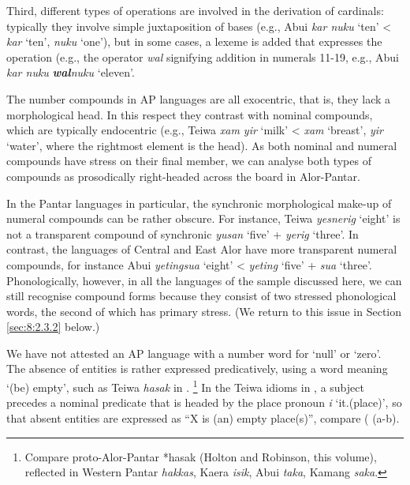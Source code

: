 \documentclass[output=paper]{LSP/langsci}
\begin{document}
Third, different types of operations are involved in the derivation of cardinals: typically they involve simple juxtaposition of bases (e.g., Abui \textit{kar nuku} `ten' {\textless} \textit{kar} `ten', \textit{nuku} `one'), but in some cases, a lexeme is added that expresses the operation (e.g., the operator \textit{wal} signifying addition in numerals 11-19, e.g., Abui \textit{kar nuku} \textbf{\textit{wal}}\textit{nuku} `eleven'. 

The number compounds in AP languages are all exocentric, that is, they lack a morphological head. In this respect they contrast with nominal compounds, which are typically endocentric (e.g., Teiwa \textit{xam yir} `milk' {\textless} \textit{xam} `breast', \textit{yir} `water', where the rightmost element is the head). As both nominal and numeral compounds have stress on their final member, we can analyse both types of compounds as prosodically right-headed across the board in Alor-Pantar. 

In the Pantar languages in particular, the synchronic morphological make-up of numeral compounds can be rather obscure. For instance, Teiwa \textit{yesnerig} `eight' is not a transparent compound of synchronic \textit{yusan} `five' + \textit{yerig} `three'. In contrast, the languages of Central and East Alor have more transparent numeral compounds, for instance Abui \textit{yetingsua} `eight' {\textless} \textit{yeting} `five' + \textit{sua} `three'. Phonologically, however, in all the languages of the sample discussed here, we can still recognise compound forms because they consist of two stressed phonological words, the second of which has primary stress. (We return to this issue in Section \ref{sec:8:2.3.2} below.) 

We have not attested an AP language with a number word for `null' or `zero'. The absence of entities is rather expressed predicatively, using a word meaning `(be) empty', such as Teiwa \textit{hasak} in .
\footnote{{}  Compare proto-Alor-Pantar *hasak (Holton and Robinson, this volume), reflected in Western Pantar \textit{hakkas}, Kaera \textit{isik}, Abui \textit{taka}, Kamang \textit{saka}.} In the Teiwa idioms in , a subject precedes a nominal predicate that is headed by the place pronoun \textit{i} `it.(place)', so that absent entities are expressed as ``X is (an) empty place(s)'', compare ( (a-b).
\end{document}
